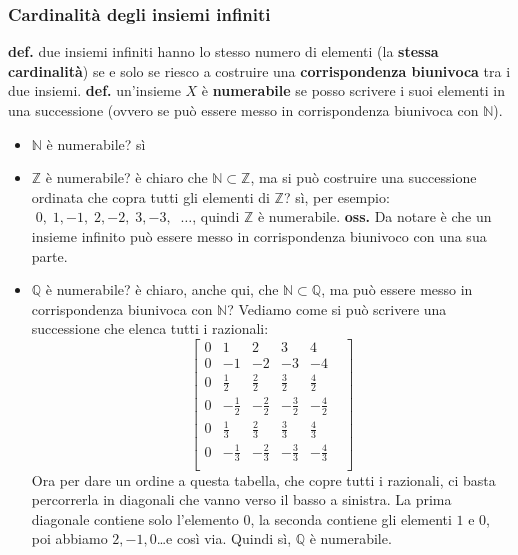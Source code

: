\subsubsection*{Cardinalità degli insiemi infiniti}
\textbf{def.} due insiemi infiniti hanno lo stesso numero di elementi (la \textbf{stessa cardinalità}) se e solo se riesco a costruire una \textbf{corrispondenza biunivoca} tra i due insiemi.\newline
\newline
\textbf{def.} un'insieme $X$ è \textbf{numerabile} se posso scrivere i suoi elementi in una successione (ovvero se può essere messo in corrispondenza biunivoca con $\mathbb{N}$).\newline
\begin{itemize}
    \item $\mathbb{N}$ è numerabile? sì
    \item $\mathbb{Z}$ è numerabile? è chiaro che $\mathbb{N} \subset \mathbb{Z}$, ma si può costruire una successione ordinata che copra tutti gli elementi di $\mathbb{Z}$? sì, per esempio: $ \;0, \;1, -1, \;2, -2, \;3, -3, \;\;\dots$, quindi $\mathbb{Z}$ è numerabile.
    \textbf{oss.} Da notare è che un insieme infinito può essere messo in corrispondenza biunivoco con una sua parte.
    \item $\mathbb{Q}$ è numerabile? è chiaro, anche qui, che $\mathbb{N} \subset \mathbb{Q}$, ma può essere messo in corrispondenza biunivoca con $\mathbb{N}$? \newline
    Vediamo come si può scrivere una successione che elenca tutti i razionali:
    \[
        \begin{bmatrix}
            0& 1& 2& 3& 4&\\
            0& -1& -2& -3& -4&\\
            0& \frac{1}{2}& \frac{2}{2}& \frac{3}{2}& \frac{4}{2}&\\
            0& -\frac{1}{2}& -\frac{2}{2}& -\frac{3}{2}& -\frac{4}{2}&\\
            0& \frac{1}{3}& \frac{2}{3}& \frac{3}{3}& \frac{4}{3}&\\
            0& -\frac{1}{3}& -\frac{2}{3}& -\frac{3}{3}& -\frac{4}{3}&\\
        \end{bmatrix}
    \]
    Ora per dare un ordine a questa tabella, che copre tutti i razionali, ci basta percorrerla in diagonali che vanno verso il basso a sinistra.\newline
    La prima diagonale contiene solo l'elemento $0$, la seconda contiene gli elementi $1$ e $0$, poi abbiamo $2, -1, 0$\dots e così via.\newline
    Quindi sì, $\mathbb{Q}$ è numerabile.
\end{itemize}
